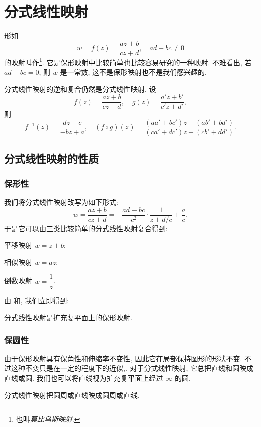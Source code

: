 \section{分式线性映射}

形如
\[
  w=f(z)=\dfrac{az+b}{cz+d},\quad ad-bc\neq 0
\]
的映射叫作\footnote{也叫\emph{莫比乌斯映射}.}.
它是保形映射中比较简单也比较容易研究的一种映射.
不难看出, 若 $ad-bc=0$, 则 $w$ 是一常数, 这不是保形映射也不是我们感兴趣的.

分式线性映射的逆和复合仍然是分式线性映射.
设
\[
  f(z)=\frac{az+b}{cz+d},\quad
  g(z)=\frac{a'z+b'}{c'z+d'},
\]
则
\[
  f^{-1}(z)=\frac{dz-c}{-bz+a},\quad
  (f\circ g)(z)=\frac{(aa'+bc')z+(ab'+bd')}{(ca'+dc')z+(cb'+dd')}.
\]

\subsection{分式线性映射的性质}

\subsubsection{保形性}

我们将分式线性映射改写为如下形式:
\[
   w
  =\frac{az+b}{cz+d}
  =-\frac{ad-bc}{c^2}\cdot\frac1{z+d/c}+\frac ac.
\]
于是它可以由三类比较简单的分式线性映射复合得到:
\begin{enuma}
  \item 平移映射 $w=z+b$;
  \item 相似映射 $w=az$;
  \item 倒数映射 $w=\dfrac1z$.
\end{enuma}
由 和, 我们立即得到:

\begin{theorem}
  分式线性映射是扩充复平面上的保形映射.
\end{theorem}


\subsubsection{保圆性}

由于保形映射具有保角性和伸缩率不变性, 因此它在局部保持图形的形状不变.
不过这种不变只是在一定的程度下的近似,.
对于分式线性映射, 它总把直线和圆映成直线或圆.
我们也可以将直线视为扩充复平面上经过 $\infty$ 的圆.

\begin{theorem}
  分式线性映射把圆周或直线映成圆周或直线.
\end{theorem}

